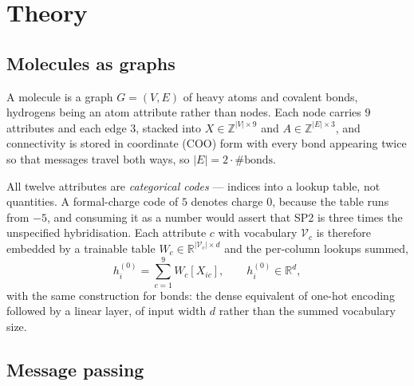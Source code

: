\section{Theory}
\label{sec:theory}

\subsection{Molecules as graphs}

A molecule is a graph $G=(V,E)$ of heavy atoms and covalent bonds, hydrogens being an atom attribute rather than nodes. Each node carries $9$ attributes and each edge $3$, stacked into $X \in \mathbb{Z}^{|V| \times 9}$ and $A \in \mathbb{Z}^{|E| \times 3}$, and connectivity is stored in coordinate (COO) form with every bond appearing twice so that messages travel both ways, so $|E| = 2 \cdot \#\text{bonds}$.

All twelve attributes are \emph{categorical codes} --- indices into a lookup table, not quantities. A formal-charge code of $5$ denotes charge $0$, because the table runs from $-5$, and consuming it as a number would assert that SP2 is three times the unspecified hybridisation. Each attribute $c$ with vocabulary $\mathcal{V}_c$ is therefore embedded by a trainable table $W_c \in \mathbb{R}^{|\mathcal{V}_c| \times d}$ and the per-column lookups summed,
\begin{equation}
    h_i^{(0)} = \sum_{c=1}^{9} W_c\!\left[X_{ic}\right], \qquad h_i^{(0)} \in \mathbb{R}^{d},
    \label{eq:atom-encoder}
\end{equation}
with the same construction for bonds: the dense equivalent of one-hot encoding followed by a linear layer, of input width $d$ rather than the summed vocabulary size.

\subsection{Message passing}

